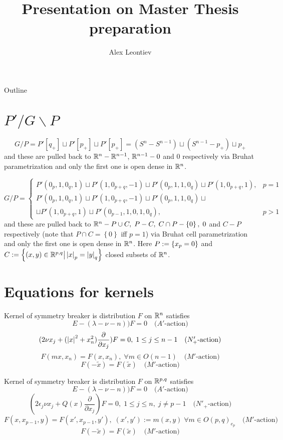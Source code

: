 \documentclass[8pt,pdf,notes]{beamer}
\title{Presentation on Master Thesis preparation}
\author{Alex Leontiev}
\theoremstyle{mystyle}
\begin{document}
\begin{frame}\titlepage\end{frame}
\begin{frame}{Outline}
	\tableofcontents
\end{frame}

\section{$P'/G\backslash P$}
\begin{frame}%
	\begin{theorem}\[G/P=P'[q_+]\sqcup P'[p_+]\sqcup P'[p_+]=
		(S^n-S^{n-1})\sqcup (S^{n-1}-{p_+})\sqcup p_+\]
		and these are pulled back to $\mathbb{R}^n-\mathbb{R}^{n-1}$, $\mathbb{R}^{n-1}-0$ and $0$ respectively via Bruhat parametrization and
		only the first one is open dense in $\mathbb{R}^n$.
\end{theorem}
\begin{theorem}[$O(p+1,q+1),\;n:=p+q$]
\[ G/P=\left\{ \begin{array}{ll}
     P' ( 0_p, 1, 0_q, 1) \sqcup P' ( 1, 0_{p + q}, - 1) \sqcup P' ( 0_p, 1,
     1, 0_q) \sqcup P' ( 1, 0_{p + q}, 1), & p = 1\\
     P' ( 0_p, 1, 0_q, 1) \sqcup P' ( 1, 0_{p + q}, - 1) \sqcup P' ( 0_p, 1,
     1, 0_q) \sqcup&\\
     \sqcup P' ( 1, 0_{p + q}, 1) \sqcup P' ( 0_{p - 1}, 1, 0, 1,
     0_q), & p > 1
   \end{array} \right. \]
   and these are pulled back to $\mathbb{R}^n-P\cup C,\;P-C,\;C\cap P-\left\{ 0 \right\}
   ,\;{0}$ and $C-P$ respectively (note that $P\cap C=\left\{ 0 \right\}$ iff $p=1$)
   via Bruhat cell parametrization and only the first one is open dense in $\mathbb{R}^n$.
Here $P:=\left\{x_{p}=0\right\}$ and $C:=\left\{(x,y)\in\mathbb{R}^{p,q}\big| \left|x\right|_{p}=\left|y\right|_{q}\right\}$ closed subsets of $\mathbb{R}^n$.
\end{theorem}
\end{frame}
\section{Equations for kernels}
\begin{frame}
\begin{theorem}Kernel of symmetry breaker is distribution $F$ on $\mathbb{R}^n$ satisfies
	\[E-(\lambda-\nu-n))F=0\quad\mbox{($A'$-action)}\]
\[(2\nu x_j+(\left|x\right|^2+x_n^2)\frac{\partial}{\partial x_j})F=0,\;1\leq j\leq n-1\quad\mbox{($N_+'$-action)}\]
\[F(mx,x_n)=F(x,x_n),\;\forall m\in O(n-1)\quad\mbox{($M'$-action)}\]
\[F(-\tilde{x})=F(\tilde{x})\quad\mbox{($M'$-action)}\]
\end{theorem}
\begin{theorem}
	Kernel of symmetry breaker is distribution $F$ on $\mathbb{R}^{p,q}$ satisfies
\[E-(\lambda-\nu-n))F=0\quad\mbox{($A'$-action)}\]
\[(2\epsilon_j\nu x_j+Q(x)\frac{\partial}{\partial x_j})F=0,\;1\leq j\leq n,\;j\neq p-1\quad\mbox{
($N'_+$-action)}\]
\[F(x,x_{p-1},y)=F(x',x_{p-1},y'),\;(x',y'):=m(x,y)\;\forall m\in O(p,q)_{e_p}\quad\mbox{($M'$-action)}\]
\[F(-\tilde{x})=F(\tilde{x})\quad\mbox{($M'$-action)}\]
\end{theorem}
\end{frame}
\end{document}
